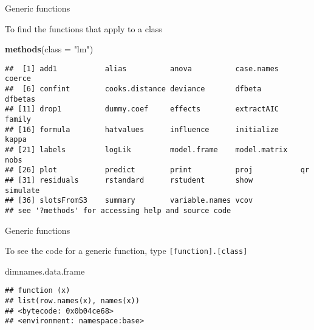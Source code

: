 \documentclass[ignorenonframetext,]{beamer}
\newenvironment{Shaded}{\begin{snugshade}}{\end{snugshade}}
\newcommand{\DataTypeTok}[1]{\textcolor[rgb]{0.13,0.29,0.53}{#1}}
\newcommand{\KeywordTok}[1]{\textcolor[rgb]{0.13,0.29,0.53}{\textbf{#1}}}
\newcommand{\NormalTok}[1]{#1}
\newcommand{\StringTok}[1]{\textcolor[rgb]{0.31,0.60,0.02}{#1}}
\begin{document}
\begin{frame}[fragile]{Generic functions}
\protect\hypertarget{generic-functions-2}{}

To find the functions that apply to a class

\footnotesize

\begin{Shaded}
\begin{Highlighting}[]
\KeywordTok{methods}\NormalTok{(}\DataTypeTok{class =} \StringTok{"lm"}\NormalTok{)}
\end{Highlighting}
\end{Shaded}

\begin{verbatim}
##  [1] add1           alias          anova          case.names     coerce        
##  [6] confint        cooks.distance deviance       dfbeta         dfbetas       
## [11] drop1          dummy.coef     effects        extractAIC     family        
## [16] formula        hatvalues      influence      initialize     kappa         
## [21] labels         logLik         model.frame    model.matrix   nobs          
## [26] plot           predict        print          proj           qr            
## [31] residuals      rstandard      rstudent       show           simulate      
## [36] slotsFromS3    summary        variable.names vcov          
## see '?methods' for accessing help and source code
\end{verbatim}

\end{frame}

\begin{frame}[fragile]{Generic functions}
\protect\hypertarget{generic-functions-3}{}

To see the code for a generic function, type
\texttt{{[}function{]}.{[}class{]}}

\footnotesize

\begin{Shaded}
\begin{Highlighting}[]
\NormalTok{dimnames.data.frame}
\end{Highlighting}
\end{Shaded}

\begin{verbatim}
## function (x) 
## list(row.names(x), names(x))
## <bytecode: 0x0b04ce68>
## <environment: namespace:base>
\end{verbatim}

\end{frame}
\end{document}

